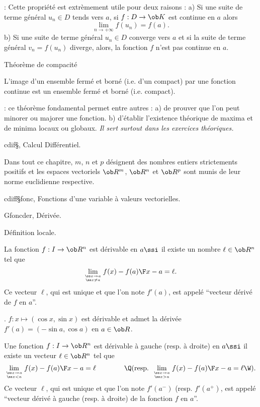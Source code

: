 \Remarque : Cette propri\'et\'e est extr\`emement utile pour deux raisons : \pn
a) Si une suite de terme g\'en\'eral $u_n\in D$ tends vers $a$, si $f:D\to\ob K$ est continue en $a$ 
alors 
$$
\lim_{n\to+\infty}f(u_n)=f(a).
$$
b) Si une suite de terme g\'en\'eral $u_n\in D$ converge vers $a$ et si la suite de terme g\'en\'eral $v_n=f(u_n)$ diverge, alors, la fonction $f$ n'est pas continue en $a$. 
\bigskip

\Concept [Index=Theoreme@Th\'eor\`eme!de compacite@de compacit\'e] Th\'eor\`eme de compacit\'e

\Theoreme 
L'image d'un ensemble ferm\'e et born\'e (i.e. d'un compact) par une fonction continue est un ensemble ferm\'e et born\'e (i.e. compact). 

\Remarque : ce th\'eor\`eme fondamental permet entre autres : \pn
a) de prouver que l'on peut minorer ou majorer une fonction. \pn
b) d'\'etablir l'existence th\'eorique de maxima et de minima locaux ou globaux. \pn
{\it Il sert surtout dans les exercices th\'eoriques. }

%

\Chapter cdif§, Calcul Diff\'erentiel. 

\bigskip
Dans tout ce chapitre, $m$, $n$ et $p$ d\'esignent des nombres entiers strictements positifs et les espaces vectoriels $\ob R^m$, $\ob R^n$ et $\ob R^p$ sont munis de leur norme euclidienne respective. 
\bigskip

\Section cdiff§fonc, Fonctions d'une variable \`a valeurs vectorielles. 

\Subsection Gfoncder, D\'eriv\'ee. 

\Concept D\'efinition locale. 

\Definition [$a\in I$ intervalle]
La fonction $f:I\to\ob R^n$ est d\'erivable en $a\ssi$ il existe un nombre $\ell\in\ob R^n$ tel que 
$$
\lim_{\ss x\to a\atop\ss x\neq a}{f(x)-f(a)\F x-a}=\ell. 
$$
Ce vecteur $\ell$, qui est unique et que l'on note $f'(a)$, est appel\'e ``vecteur d\'eriv\'e de $f$ en $a$''. 

\Exemple. $f:x\mapsto(\cos x,\sin x)$ est d\'erivable et admet la d\'eriv\'ee $f'(a)=(-\sin a, \cos a)$ en $a\in\ob R$. 

\Definition [$a\in I$ intervalle] 
Une fonction $f:I\to\ob R^n$ est d\'erivable \`a gauche (resp. \`a droite) en $a\ssi$ il existe un vecteur $\ell\in\ob R^n$ tel que 
$$
\lim_{\ss x\to a\atop\ss x<a}{f(x)-f(a)\F x-a}=\ell\qquad\qquad\Q(\mbox{resp. }\lim_{\ss x\to a\atop\ss x>a}{f(x)-f(a)\F x-a}=\ell\W). 
$$
Ce vecteur $\ell$, qui est unique et que l'on note $f'(a^-)$ (resp. $f'(a^+)$, est appel\'e ``vecteur d\'eriv\'e \`a gauche (resp. \`a droite) 
de la fonction $f$ en $a$''. 


